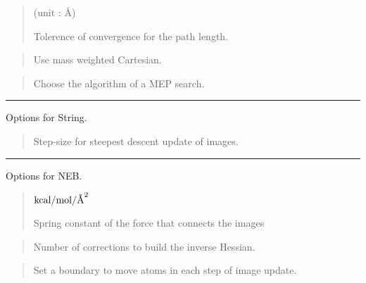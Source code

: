 \documentclass[a4paper,11pt,oneside,english]{sphinxmanual}
\begin{document}
 
\begin{quote}

 (unit : \(\text{\AA}\))

Tolerence of convergence for the path length.
\end{quote}

 
\begin{quote}


Use mass weighted Cartesian.
\end{quote}

 
\begin{quote}


Choose the algorithm of a MEP search.
\end{quote}


\bigskip\hrule\bigskip


Options for String.

 
\begin{quote}


Step-size for steepest descent update of images.
\end{quote}


\bigskip\hrule\bigskip


Options for NEB.

 
\begin{quote}

 \({\rm{kcal/mol/{\text{\AA}}^{2}}}\)

Spring constant of the force that connects the images
\end{quote}

 
\begin{quote}


Number of corrections to build the inverse Hessian.
\end{quote}

 
\begin{quote}


Set a boundary to move atoms in each step of image update.
\end{quote}
\end{document}
